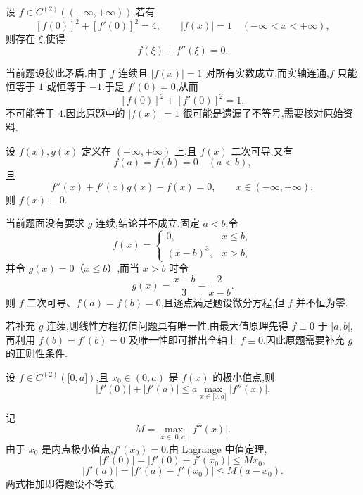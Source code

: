 \begin{example}
    设 $f\in C^{(2)}((-\infty,+\infty))$,若有
    \[
        [f(0)]^2+[f'(0)]^2=4,
        \qquad |f(x)|=1\quad(-\infty<x<+\infty),
    \]
    则存在 $\xi$,使得
    \[
        f(\xi)+f''(\xi)=0.
    \]
\end{example}
\exampleblank

\begin{solution}
    当前题设彼此矛盾.由于 $f$ 连续且 $|f(x)|=1$ 对所有实数成立,而实轴连通,$f$ 只能恒等于 $1$ 或恒等于 $-1$.于是 $f'(0)=0$,从而
    \[
        [f(0)]^2+[f'(0)]^2=1,
    \]
    不可能等于 $4$.因此原题中的 $|f(x)|=1$ 很可能是遗漏了不等号,需要核对原始资料.
\end{solution}

\begin{example}
    设 $f(x),g(x)$ 定义在 $(-\infty,+\infty)$ 上,且 $f(x)$ 二次可导,又有
    \[
        f(a)=f(b)=0\quad(a<b),
    \]
    且
    \[
        f''(x)+f'(x)g(x)-f(x)=0,
        \qquad x\in(-\infty,+\infty),
    \]
    则 $f(x)\equiv0$.
\end{example}
\exampleblank

\begin{solution}
    当前题面没有要求 $g$ 连续,结论并不成立.固定 $a<b$,令
    \[
        f(x)=
        \begin{cases}
            0,       & x\leq b, \\
            (x-b)^3, & x>b,
        \end{cases}
    \]
    并令 $g(x)=0$（$x\leq b$）,而当 $x>b$ 时令
    \[
        g(x)=\dfrac{x-b}{3}-\dfrac{2}{x-b}.
    \]
    则 $f$ 二次可导、$f(a)=f(b)=0$,且逐点满足题设微分方程,但 $f$ 并不恒为零.

    若补充 $g$ 连续,则线性方程初值问题具有唯一性.由最大值原理先得 $f\equiv0$ 于 $\lbrack a,b\rbrack$,再利用 $f(b)=f'(b)=0$ 及唯一性即可推出全轴上 $f\equiv0$.因此原题需要补充 $g$ 的正则性条件.
\end{solution}

\begin{example}
    设 $f\in C^{(2)}(\lbrack 0,a\rbrack)$,且 $x_0\in(0,a)$ 是 $f(x)$ 的极小值点,则
    \[
        |f'(0)|+|f'(a)|
        \leq a\max\limits_{x\in\lbrack 0,a\rbrack}|f''(x)|.
    \]
\end{example}
\exampleblank

\begin{solution}
    记
    \[
        M=\max\limits_{x\in\lbrack0,a\rbrack}|f''(x)|.
    \]
    由于 $x_0$ 是内点极小值点,$f'(x_0)=0$.由 Lagrange 中值定理,
    \[
        |f'(0)|=|f'(0)-f'(x_0)|\leq Mx_0,
    \]
    \[
        |f'(a)|=|f'(a)-f'(x_0)|\leq M(a-x_0).
    \]
    两式相加即得题设不等式.
\end{solution}


